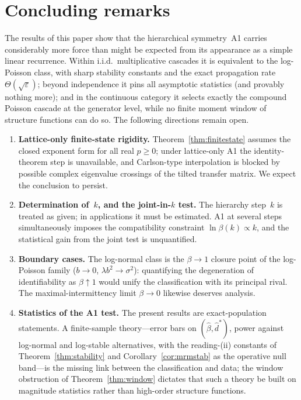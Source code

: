 \documentclass[pdflatex,sn-mathphys-num]{sn-jnl}
\theoremstyle{thmstyleone}
\theoremstyle{thmstyletwo}
\theoremstyle{thmstylethree}
\begin{document}
\section{Concluding remarks}
\label{sec:discussion}

The results of this paper show that the hierarchical symmetry~A1
carries considerably more force than might be expected from its
appearance as a simple linear recurrence.  Within i.i.d.\
multiplicative cascades it is equivalent to the log-Poisson class,
with sharp stability constants and the exact propagation rate
$\Theta(\sqrt\varepsilon)$; beyond independence it pins all
asymptotic statistics (and provably nothing more); and in the
continuous category it selects exactly the compound Poisson
cascade at the generator level, while no finite moment window of
structure functions can do so.  The following directions remain
open.

\begin{enumerate}
\item \textbf{Lattice-only finite-state rigidity.}
  Theorem~\ref{thm:finitestate} assumes the closed exponent form for
  all real $p \ge 0$; under lattice-only A1 the identity-theorem
  step is unavailable, and Carlson-type interpolation is blocked by
  possible complex eigenvalue crossings of the tilted transfer
  matrix.  We expect the conclusion to persist.

\item \textbf{Determination of~$k$, and the joint-in-$k$ test.}
  The hierarchy step~$k$ is treated as given; in applications it
  must be estimated.  A1 at several steps simultaneously imposes the
  compatibility constraint $\ln\beta(k) \propto k$, and the
  statistical gain from the joint test is unquantified.

\item \textbf{Boundary cases.}  The log-normal class is the $\beta
  \to 1$ closure point of the log-Poisson family ($b \to 0$,
  $\lambda b^2 \to \sigma^2$): quantifying the degeneration of
  identifiability as $\beta \uparrow 1$ would unify the
  classification with its principal rival.  The maximal-intermittency
  limit $\beta \to 0$ likewise deserves analysis.

\item \textbf{Statistics of the A1 test.}  The present results are
  exact-population statements.  A finite-sample theory---error bars
  on $(\hat\beta, \hat d^*)$, power against log-normal and
  log-stable alternatives, with the reading-(ii) constants of
  Theorem~\ref{thm:stability} and Corollary~\ref{cor:mrmstab} as the
  operative null band---is the missing link between the
  classification and data; the window obstruction of
  Theorem~\ref{thm:window} dictates that such a theory be built on
  magnitude statistics rather than high-order structure functions.
\end{enumerate}
\end{document}
